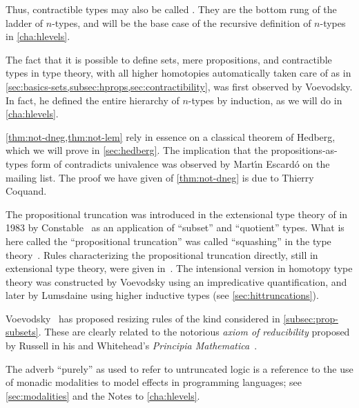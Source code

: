Thus, contractible types may also be called .
They are the bottom rung of the ladder of $n$-types, and will be the base case of the recursive definition of $n$-types in \cref{cha:hlevels}.

%
%

\sectionNotes

The fact that it is possible to define sets, mere propositions, and contractible types in type theory, with all higher homotopies automatically taken care of as in \cref{sec:basics-sets,subsec:hprops,sec:contractibility}, was first observed by Voevodsky.
In fact, he defined the entire hierarchy of $n$-types by induction, as we will do in \cref{cha:hlevels}.%

\cref{thm:not-dneg,thm:not-lem} rely in essence on a classical theorem of Hedberg,
%
%
which we will prove in \cref{sec:hedberg}.
The implication that the propositions-as-types form of \LEM{} contradicts univalence was observed by Mart\'\i n Escard\'o on the \Agda mailing list.
The proof we have given of \cref{thm:not-dneg} is due to Thierry Coquand.

The propositional truncation was introduced in the extensional type theory of
%
\NuPRL in 1983 by Constable~\cite{Con85} as an
application of ``subset'' and ``quotient'' types.  What is here called the
``propositional truncation'' was called ``squashing'' in the \NuPRL type theory~\cite{constable+86nuprl-book}.
Rules characterizing the propositional truncation directly, still in extensional type theory, were given in~\cite{ab:bracket-types}.
The intensional version in homotopy type theory was constructed by Voevodsky using an impredicative quantification, and later by Lumsdaine using higher inductive types (see \cref{sec:hittruncations}).

%
Voevodsky~\cite{Universe-poly} has proposed resizing rules of the kind considered in \cref{subsec:prop-subsets}.
%
These are clearly related to the notorious \emph{axiom of reducibility} proposed by Russell in his and Whitehead's \emph{Principia Mathematica}~\cite{PM2}.

The adverb ``purely'' as used to refer to untruncated logic is a reference to the use of monadic modalities to model effects in programming languages; see \cref{sec:modalities} and the Notes to \cref{cha:hlevels}.

